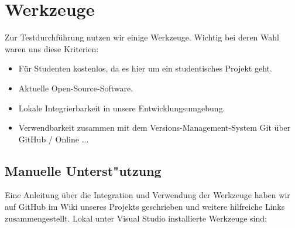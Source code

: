 %



\section{Werkzeuge}
\label{Abschnitt:Tests:Werkzeuge}

Zur Testdurchführung nutzen wir einige Werkzeuge. Wichtig bei deren Wahl waren uns diese Kriterien:

\begin{itemize}

	\item Für Studenten kostenlos, da es hier um ein studentisches Projekt geht.
	\item Aktuelle Open-Source-Software.
	\item Lokale Integrierbarkeit in unsere Entwicklungsumgebung.
	\item Verwendbarkeit zusammen mit dem Versions-Management-System Git über GitHub / Online ... %

\end{itemize}

\subsection{Manuelle Unterst{"u}tzung}
\label{Abschnitt:Programmfehler:Werkzeuge:Manuell}

Eine Anleitung über die Integration und Verwendung der Werkzeuge haben wir auf GitHub im Wiki unseres Projekts geschrieben und weitere hilfreiche Links zusammengestellt. Lokal unter Visual Studio installierte Werkzeuge sind:
\\
\\

